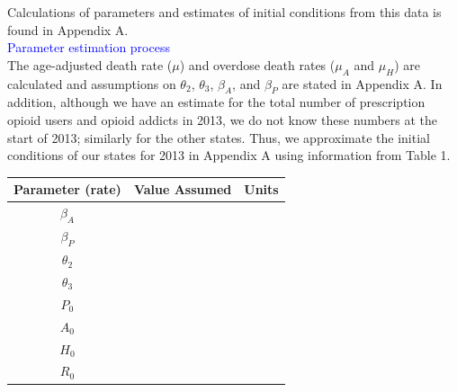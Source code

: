 \documentclass[12pt]{article}
\begin{document}
Calculations of parameters and estimates of initial conditions from this data is found in Appendix A. \\



\textcolor{blue}{Parameter estimation process} \\
The age-adjusted death rate ($\mu$) and overdose death rates ($\mu_{A}$ and $\mu_{H}$) are calculated and assumptions on $\theta_2$, $\theta_3$, $\beta_A$, and $\beta_P$ are stated in Appendix A. In addition, although we have an estimate for the total number of prescription opioid users and opioid addicts in 2013, we do not know these numbers at the start of 2013; similarly for the other states. Thus, we approximate the initial conditions of our states for 2013 in Appendix A using information from Table 1. 

\begin{center}

\begin{tabular}{|c | c | c|}

 \hline

{Parameter (rate)} & {Value Assumed} & {Units} \\ [0.5ex]

 \hline\hline

$\beta_A$ &  &  \\

\hline

$\beta_P$&  &  \\

\hline

$\theta_2$ &  &  \\

\hline

$\theta_3$ &  &  \\

\hline


$P_0$ &  &  \\

\hline

$A_0$ &  &  \\

\hline

$H_0$ &  &  \\

\hline

$R_0$ &  &  \\

\hline
\end{tabular}

\end{center}
 
\end{document}

